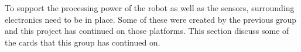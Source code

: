 To support the processing power of the robot as well as the sensors, surrounding electronics need to be in place. Some of these were created by the previous group and this project has continued on those platforms. This section discuss some of the cards that this group has continued on. 
	
